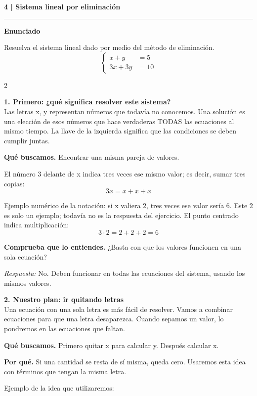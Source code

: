\documentclass[11pt,a4paper,landscape]{article}
\newcommand{\titulo}[1]{{\LARGE\bfseries #1}\par\smallskip\hrule\medskip}
\begin{document}
\newpage{}\hypertarget{1.1-4}{}
\titulo{4 | Sistema lineal por eliminación}
\textbf{Enunciado}\par Resuelva el sistema lineal dado por medio del método de eliminación.
\[\left\{\begin{aligned}x + y &= 5\\3x + 3y &= 10\end{aligned}\right.\]
\begin{multicols*}{2}
\noindent\begin{minipage}{\linewidth}\textbf{1. Primero: ¿qué significa resolver este sistema?}\\[2pt]Las letras x, y representan números que todavía no conocemos. Una solución es una elección de esos números que hace verdaderas TODAS las ecuaciones al mismo tiempo. La llave de la izquierda significa que las condiciones se deben cumplir juntas.
\par\smallskip\textbf{Qué buscamos.} Encontrar una misma pareja de valores.
\par\smallskip El número 3 delante de x indica tres veces ese mismo valor; es decir, sumar tres copias:
\[3x=x+x+x\]
\par\smallskip Ejemplo numérico de la notación: si x valiera 2, tres veces ese valor sería 6. Este 2 es solo un ejemplo; todavía no es la respuesta del ejercicio. El punto centrado indica multiplicación:
\[3\cdot 2=2+2+2=6\]
\par\smallskip\textbf{Comprueba que lo entiendes.} ¿Basta con que los valores funcionen en una sola ecuación?\par\textit{Respuesta:} No. Deben funcionar en todas las ecuaciones del sistema, usando los mismos valores.
\end{minipage}\par\medskip
\noindent\begin{minipage}{\linewidth}\textbf{2. Nuestro plan: ir quitando letras}\\[2pt]Una ecuación con una sola letra es más fácil de resolver. Vamos a combinar ecuaciones para que una letra desaparezca. Cuando sepamos un valor, lo pondremos en las ecuaciones que faltan.
\par\smallskip\textbf{Qué buscamos.} Primero quitar x para calcular y. Después calcular x.
\par\smallskip\textbf{Por qué.} Si una cantidad se resta de sí misma, queda cero. Usaremos esta idea con términos que tengan la misma letra.
\par\smallskip Ejemplo de la idea que utilizaremos:

\end{minipage}
\end{multicols*}
\end{document}
